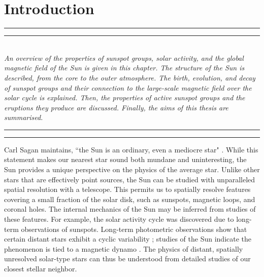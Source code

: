 
\chapter{Introduction}\label{chapter:intro}

\graphicspath{{X/figures/EPS/}{1_introduction/figures/}}

\hrule height 1mm
\vspace{0.5mm}
\hrule height 0.4mm 
\noindent 
\\ {\it 
An overview of the properties of sunspot groups, solar activity, and the global magnetic field of the Sun is given in this chapter. The structure of the Sun is described, from the core to the outer atmosphere. The birth, evolution, and decay of sunspot groups and their connection to the large-scale magnetic field over the solar cycle is explained. Then, the properties of active sunspot  groups and the eruptions they produce are discussed. Finally, the aims of this thesis are summarised.
}
\\ 
\hrule height 0.4mm
\vspace{0.5mm}
\hrule height 1mm 
\vspace{1.5cm}


Carl Sagan maintains, ``the Sun is an ordinary, even a mediocre star" \citep{Sagan:1980}. While this statement makes our nearest star sound both mundane and uninteresting, the Sun provides a unique perspective on the physics of the average star. Unlike other stars that are effectively point sources, the Sun can be studied with unparalleled spatial resolution with a telescope. This permits us to spatially resolve features covering a small fraction of the solar disk, such as sunspots, magnetic loops, and coronal holes. The internal mechanics of the Sun may be inferred from studies of these features. For example, the solar activity cycle was discovered due to long-term observations of sunspots. Long-term photometric observations show that certain distant stars exhibit a cyclic variability \citep{Metcalfe:2010}; studies of the Sun indicate the phenomenon is tied to a magnetic dynamo \citep{Parker:1955}. The physics of distant, spatially unresolved solar-type stars can thus be understood from detailed studies of our closest stellar neighbor. 

